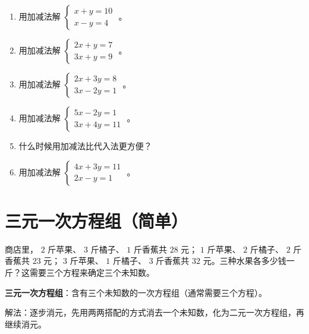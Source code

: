 \begin{practice}


\begin{enumerate}
  \item 用加减法解 $\begin{cases} x + y = 10 \\ x - y = 4 \end{cases}$ 。
  \item 用加减法解 $\begin{cases} 2x + y = 7 \\ 3x + y = 9 \end{cases}$ 。
  \item 用加减法解 $\begin{cases} 2x + 3y = 8 \\ 3x - 2y = 1 \end{cases}$ 。
  \item 用加减法解 $\begin{cases} 5x - 2y = 1 \\ 3x + 4y = 11 \end{cases}$ 。
  \item 什么时候用加减法比代入法更方便？
  \item 用加减法解 $\begin{cases} 4x + 3y = 11 \\ 2x - y = 1 \end{cases}$ 。
\end{enumerate}


\end{practice}

\section*{三元一次方程组（简单）}


\begin{explore}


商店里， $2$ 斤苹果、 $3$ 斤橘子、 $1$ 斤香蕉共 $28$ 元； $1$ 斤苹果、 $2$ 斤橘子、 $2$ 斤香蕉共 $23$ 元； $3$ 斤苹果、 $1$ 斤橘子、 $3$ 斤香蕉共 $32$ 元。三种水果各多少钱一斤？这需要三个方程来确定三个未知数。

\end{explore}

\begin{understand}


\textbf{三元一次方程组}：含有三个未知数的一次方程组（通常需要三个方程）。

解法：逐步消元，先用两两搭配的方式消去一个未知数，化为二元一次方程组，再继续消元。

\end{understand}

